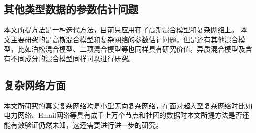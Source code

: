 \documentclass[a4paper,12pt,openany,oneside,utf-8]{ctexbook}
\begin{document}
	\subsection{其他类型数据的参数估计问题}
	本文所提方法是一种迭代方法，目前只应用在了高斯混合模型和复杂网络上。
	本文主要研究的是高斯混合模型和复杂网络的参数估计问题，但是还有其他混合模型，比如泊松混合模型、二项混合模型等也同样具有研究价值。异质混合模型及含有不同成分的混合模型同样可以进行研究。
	
	\subsection{复杂网络方面}
	本文所研究的真实复杂网络均是小型无向复杂网络，在面对超大型复杂网络时比如电力网络、Email网络等具有成千上万个节点和社团的数据时本文所提方法是否还能有效验证仍然未知，这还需要进行进一步的研究。
	
	
	
	
	
	
	
\end{document}
